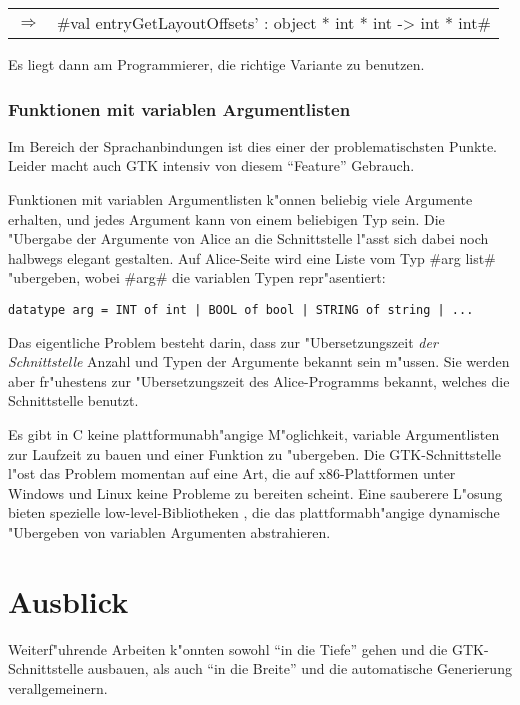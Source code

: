 \documentclass[a4paper,titlepage]{article}
\newcommand{\doparskip}{\bigskip}
\newcommand{\ra}{$\Longrightarrow$}
\begin{document}
\begin{tabular}{rl}
  \ra & #val entryGetLayoutOffsets' : object * int * int -> int * int#
\end{tabular}
\doparskip

Es liegt dann am Programmierer, die richtige Variante zu benutzen.

\subsubsection*{Funktionen mit variablen Argumentlisten}

Im Bereich der Sprachanbindungen ist dies einer der problematischsten
Punkte. Leider macht auch GTK intensiv von diesem ``Feature'' Gebrauch.

Funktionen mit variablen Argumentlisten k"onnen beliebig viele Argumente
erhalten, und jedes Argument kann von einem beliebigen Typ sein.
Die "Ubergabe der Argumente von Alice an die Schnittstelle l"asst sich dabei
noch halbwegs elegant gestalten. Auf Alice-Seite wird eine Liste vom Typ
#arg list# "ubergeben, wobei #arg# die variablen Typen repr"asentiert:

\begin{verbatim}
datatype arg = INT of int | BOOL of bool | STRING of string | ...
\end{verbatim}

Das eigentliche Problem besteht darin, dass zur "Ubersetzungszeit
\emph{der Schnittstelle} Anzahl und Typen der Argumente bekannt sein m"ussen.
Sie werden aber fr"uhestens zur "Ubersetzungszeit des
Alice-Programms bekannt, welches die Schnittstelle benutzt.

Es gibt in C keine plattformunabh"angige M"oglichkeit,
variable Argumentlisten zur Laufzeit zu bauen und einer Funktion zu "ubergeben.
Die GTK-Schnittstelle l"ost das Problem momentan auf eine Art, die
auf x86-Plattformen unter Windows und Linux keine Probleme
zu bereiten scheint.
Eine sauberere L"osung bieten spezielle low-level-Bibliotheken \cite{libffi}, 
die das plattformabh"angige dynamische "Ubergeben
von variablen Argumenten abstrahieren.


\section{Ausblick}

Weiterf"uhrende Arbeiten k"onnten sowohl ``in die Tiefe'' gehen und die
GTK-Schnittstelle ausbauen, als auch ``in die Breite'' und die automatische
Generierung verallgemeinern.
\end{document}
